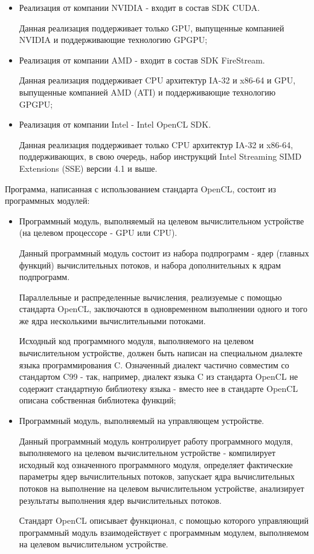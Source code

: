 \begin{itemize}

	\item Реализация от компании NVIDIA - входит в состав SDK CUDA.

		Данная реализация поддерживает только GPU, выпущенные компанией NVIDIA и поддерживающие технологию GPGPU;

	\item Реализация от компании AMD - входит в состав SDK FireStream.

		Данная реализация поддерживает CPU архитектур IA-32 и x86-64 и GPU, выпущенные компанией AMD (ATI) и поддерживающие технологию GPGPU;

	\item Реализация от компании Intel - Intel OpenCL SDK.

		Данная реализация поддерживает только CPU архитектур IA-32 и x86-64, поддерживающих, в свою очередь, набор инструкций Intel Streaming SIMD Extensions (SSE) версии 4.1 и выше.

\end{itemize}

Программа, написанная с использованием стандарта OpenCL, состоит из программных модулей:

\begin{itemize}

	\item Программный модуль, выполняемый на целевом вычислительном устройстве (на целевом процессоре - GPU или CPU).
	
		Данный программный модуль состоит из набора подпрограмм - ядер (главных функций) вычислительных потоков, и набора дополнительных к ядрам подпрограмм.

		Параллельные и распределенные вычисления, реализуемые с помощью стандарта OpenCL, заключаются в одновременном выполнении одного и того же ядра несколькими вычислительными потоками.

		Исходный код программного модуля, выполняемого на целевом вычислительном устройстве, должен быть написан на специальном диалекте языка программирования C. Означенный диалект частично совместим со стандартом C99 - так, например, диалект языка C из стандарта OpenCL не содержит стандартную библиотеку языка - вместо нее в стандарте OpenCL описана собственная библиотека функций;

	\item Программный модуль, выполняемый на управляющем устройстве.

		Данный программный модуль контролирует работу программного модуля, выполняемого на целевом вычислительном устройстве - компилирует исходный код означенного программного модуля, определяет фактические параметры ядер вычислительных потоков, запускает ядра вычислительных потоков на выполнение на целевом вычислительном устройстве, анализирует результаты выполнения ядер вычислительных потоков.

		Стандарт OpenCL описывает функционал, с помощью которого управляющий программный модуль взаимодействует с программным модулем, выполняемом на целевом вычислительном устройстве.

\end{itemize}


